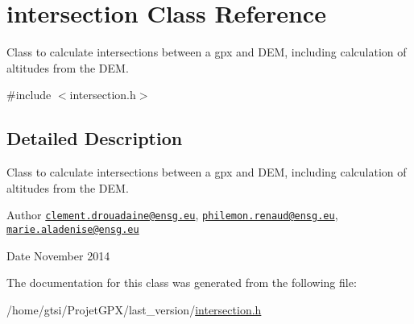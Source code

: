 \hypertarget{classintersection}{\section{intersection Class Reference}
\label{classintersection}
}


Class to calculate intersections between a gpx and D\+E\+M, including calculation of altitudes from the D\+E\+M.  




{\ttfamily \#include $<$intersection.\+h$>$}



\subsection{Detailed Description}
Class to calculate intersections between a gpx and D\+E\+M, including calculation of altitudes from the D\+E\+M. 

\begin{DoxyAuthor}{Author}
\href{mailto:clement.drouadaine@ensg.eu}{\tt clement.\+drouadaine@ensg.\+eu}, \href{mailto:philemon.renaud@ensg.eu}{\tt philemon.\+renaud@ensg.\+eu}, \href{mailto:marie.aladenise@ensg.eu}{\tt marie.\+aladenise@ensg.\+eu} 
\end{DoxyAuthor}
\begin{DoxyDate}{Date}
November 2014 
\end{DoxyDate}


The documentation for this class was generated from the following file\+:\begin{DoxyCompactItemize}
\item 
/home/gtsi/\+Projet\+G\+P\+X/last\+\_\+version/\hyperlink{intersection_8h}{intersection.\+h}\end{DoxyCompactItemize}
